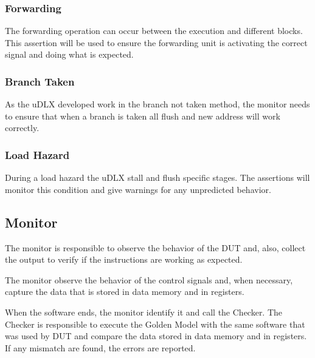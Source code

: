 \documentclass{article}
\begin{document}
	\subsubsection{Forwarding}
	
	The forwarding operation can occur between the execution and different blocks. This assertion will be used to ensure the forwarding unit is activating the correct signal and doing what is expected.
	
	\subsubsection{Branch Taken}
	
	As the uDLX developed work in the branch not taken method, the monitor needs to ensure that when a branch is taken all flush and new address will work correctly.
	
	\subsubsection{Load Hazard}

	During a load hazard the uDLX stall and flush specific stages. The assertions will monitor this condition and give warnings for any unpredicted behavior.	
	
	\subsection{Monitor}
	
	The monitor is responsible to observe the behavior of the DUT and, also, collect the output to verify if the instructions are working as expected.
	
	The monitor observe the behavior of the control signals and, when necessary, capture the data that is stored in data memory and in registers.
	
	When the software ends, the monitor identify it and call the Checker.
The Checker is responsible to execute the Golden Model with the same software that was used by DUT and compare the data stored in data memory and in registers. If any mismatch are found, the errors are reported.

	

	
\end{document}
